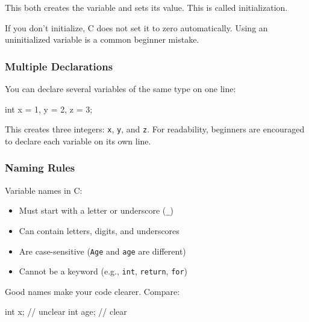 \documentclass[
  letterpaper,
  DIV=11,
  numbers=noendperiod]{scrreprt}
\newenvironment{Shaded}{\begin{snugshade}}{\end{snugshade}}
\newcommand{\CommentTok}[1]{\textcolor[rgb]{0.37,0.37,0.37}{#1}}
\newcommand{\DataTypeTok}[1]{\textcolor[rgb]{0.68,0.00,0.00}{#1}}
\newcommand{\DecValTok}[1]{\textcolor[rgb]{0.68,0.00,0.00}{#1}}
\newcommand{\NormalTok}[1]{\textcolor[rgb]{0.00,0.23,0.31}{#1}}
\newcommand{\OperatorTok}[1]{\textcolor[rgb]{0.37,0.37,0.37}{#1}}
\providecommand{\tightlist}{%
  \setlength{\itemsep}{0pt}\setlength{\parskip}{0pt}}
\begin{document}
This both creates the variable and sets its value. This is called
initialization.

If you don't initialize, C does not set it to zero automatically. Using
an uninitialized variable is a common beginner mistake.

\subsubsection{Multiple Declarations}\label{multiple-declarations}

You can declare several variables of the same type on one line:

\begin{Shaded}
\begin{Highlighting}[]
\DataTypeTok{int}\NormalTok{ x }\OperatorTok{=} \DecValTok{1}\OperatorTok{,}\NormalTok{ y }\OperatorTok{=} \DecValTok{2}\OperatorTok{,}\NormalTok{ z }\OperatorTok{=} \DecValTok{3}\OperatorTok{;}
\end{Highlighting}
\end{Shaded}

This creates three integers: \texttt{x}, \texttt{y}, and \texttt{z}. For
readability, beginners are encouraged to declare each variable on its
own line.

\subsubsection{Naming Rules}\label{naming-rules}

Variable names in C:

\begin{itemize}
\tightlist
\item
  Must start with a letter or underscore (\texttt{\_})
\item
  Can contain letters, digits, and underscores
\item
  Are case-sensitive (\texttt{Age} and \texttt{age} are different)
\item
  Cannot be a keyword (e.g., \texttt{int}, \texttt{return},
  \texttt{for})
\end{itemize}

Good names make your code clearer. Compare:

\begin{Shaded}
\begin{Highlighting}[]
\DataTypeTok{int}\NormalTok{ x}\OperatorTok{;}   \CommentTok{// unclear}
\DataTypeTok{int}\NormalTok{ age}\OperatorTok{;} \CommentTok{// clear}
\end{Highlighting}
\end{Shaded}
\end{document}
